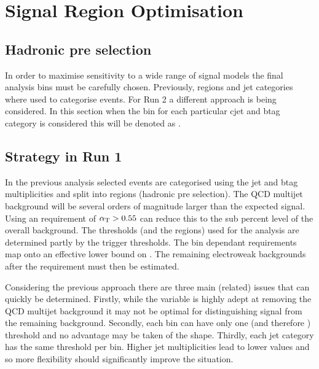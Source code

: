 
\chapter{Signal Region Optimisation} %

\label{Chapter5} %


\section{Hadronic pre selection}
In order to maximise sensitivity to a wide range of signal models the final analysis bins must be carefully chosen. Previously, \scalht regions and jet categories where used to categorise events. For Run 2 a different approach is being considered. In this section when the \scalht bin for each particular cjet and btag category is considered this will be denoted as \scalhtcat.


\section{Strategy in Run 1}

In the previous analysis selected events are categorised using the jet and btag multiplicities and split into \scalht regions (hadronic pre selection). The QCD multijet background will be several orders of magnitude larger than the expected signal. Using an \alphat requirement of $\alpha_{\text{T}} > 0.55$ can reduce this to the sub percent level of the overall background. The \alphat thresholds (and the \scalht regions) used for the analysis are determined partly by the trigger thresholds. The \scalht bin dependant \alphat requirements map onto an effective lower bound on \mht. The remaining electroweak backgrounds after the \alphat requirement must then be estimated.


Considering the previous approach there are three main (related) issues that can quickly be determined. Firstly, while the \alphat variable is highly adept at removing the QCD multijet background it may not be optimal for distinguishing signal from the remaining background. Secondly, each bin can have only one \alphat (and therefore \mht) threshold and no advantage may be taken of the shape. Thirdly, each jet category has the same \alphat threshold per \scalht bin. Higher jet multiplicities lead to lower \alphat values and so more flexibility should significantly improve the situation.


